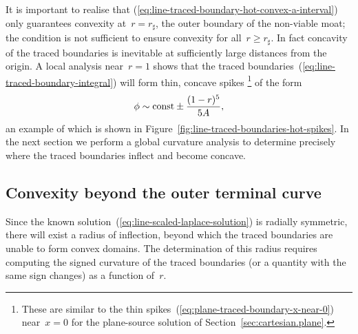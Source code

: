 \begin{figure}
\end{figure}

It is important to realise that
(\ref{eq:line-traced-boundary-hot-convex-a-interval})~%
only guarantees convexity at~$r = r_\sharp$,
the outer boundary of the non-viable moat;
the condition is not sufficient to ensure convexity for all~$r \ge r_\sharp$.
In fact concavity of the traced boundaries is inevitable
at sufficiently large distances from the origin.
A local analysis near~$r = 1$ shows that
the traced boundaries~(\ref{eq:line-traced-boundary-integral})
will form thin, concave spikes%
\footnote{
  These are similar
  to the thin spikes~(\ref{eq:plane-traced-boundary-x-near-0})
  near~$x = 0$ for the plane-source solution
  of Section~\ref{sec:cartesian.plane}.
}
of the form
\begin{equation}
  \phi \sim \mathrm{const} \pm \frac{(1 - r)^5}{5 A},
  \label{eq:line-traced-boundary-r-near-1}
\end{equation}
an example of which is shown in
Figure~\ref{fig:line-traced-boundaries-hot-spikes}.
In the next section we perform a global curvature analysis
to determine precisely where the traced boundaries inflect
and become concave.

\subsection{Convexity beyond the outer terminal curve}
\label{sec:polar.convex.beyond}

Since the known solution~(\ref{eq:line-scaled-laplace-solution})
is radially symmetric,
there will exist a radius of inflection,
beyond which the traced boundaries are unable to form convex domains.
The determination of this radius requires
computing the signed curvature of the traced boundaries
(or a quantity with the same sign changes)
as a function of~$r$.

